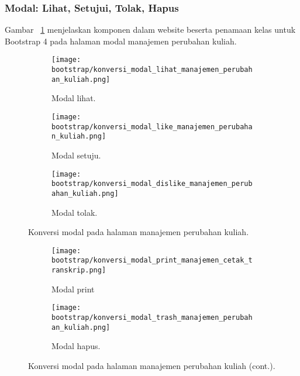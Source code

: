 \subsubsection{Modal: Lihat, Setujui, Tolak, Hapus}

\noindent Gambar ~\ref{fig:konversiModalManajemenPerubahanKuliah} menjelaskan komponen dalam website beserta penamaan kelas untuk Bootstrap 4 pada halaman modal manajemen perubahan kuliah.\\
\begin{figure}[H]
	\centering
	\begin{subfigure}[b]{0.6\linewidth} 
		\texttt{[image: bootstrap/konversi\_modal\_lihat\_manajemen\_perubahan\_kuliah.png]}
		\caption{Modal lihat.}
	\end{subfigure}	
	\begin{subfigure}[b]{0.6\linewidth} 
		\texttt{[image: bootstrap/konversi\_modal\_like\_manajemen\_perubahan\_kuliah.png]}
		\caption{Modal setuju.}
	\end{subfigure}	
	\begin{subfigure}[b]{0.6\linewidth}  
		\texttt{[image: bootstrap/konversi\_modal\_dislike\_manajemen\_perubahan\_kuliah.png]}
		\caption{Modal tolak.}
	\end{subfigure}
\caption{Konversi modal pada halaman manajemen perubahan kuliah.}

\end{figure}

\begin{figure}[H] \ContinuedFloat
	\centering
	\begin{subfigure}[b]{0.6\linewidth} 
		\texttt{[image: bootstrap/konversi\_modal\_print\_manajemen\_cetak\_transkrip.png]}
		\caption{Modal print}
	\end{subfigure}	
	\begin{subfigure}[b]{0.6\linewidth}  
		\texttt{[image: bootstrap/konversi\_modal\_trash\_manajemen\_perubahan\_kuliah.png]}
		\caption{Modal hapus.}
	\end{subfigure}
\caption{Konversi modal pada halaman manajemen perubahan kuliah (cont.).}
\label{fig:konversiModalManajemenPerubahanKuliah}
\end{figure}

